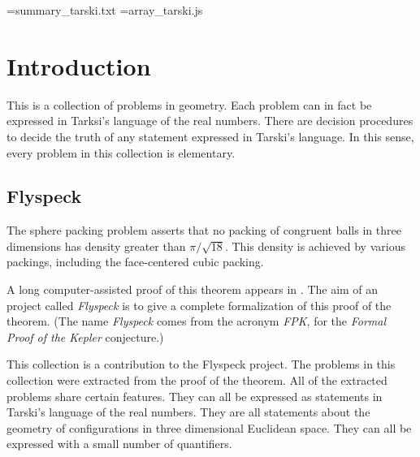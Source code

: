 






\newwrite\mywrite
\immediate\openout\mywrite=summary_tarski.txt
\newwrite\myhtml
\immediate\openout\myhtml=array_tarski.js

\def\filetarskiaway{
\immediate\write\mywrite{}\closeout\mywrite 
\immediate\write\myhtml{//fin}\closeout\myhtml
}


\section{Introduction}
\label{tarski:XX}


This is a collection of problems
in geometry.  Each problem can in fact be expressed in 
Tarksi's language of the real numbers.  There are decision
procedures to decide 
the truth of
any statement expressed in Tarski's language.  In this
sense, every problem in this collection is elementary.



\subsection{Flyspeck}

The sphere packing problem asserts that no packing of congruent
balls in three dimensions has density greater than $\pi/\sqrt{18}$.
This density is achieved by various packings, including the
face-centered cubic packing.

A long computer-assisted proof of this theorem appears
in \cite{DCG}.  The aim of an project called {\it Flyspeck} is
to give a complete formalization of this proof of the theorem.
  (The name {\it Flyspeck} comes from the acronym {\it FPK},
for the {\it Formal Proof of the Kepler} conjecture.)

This collection is a contribution to the Flyspeck project.  The problems
in this collection were extracted from the proof of the theorem.   
All of the extracted problems share certain 
features.  They can all be expressed as statements in Tarski's
language of the real numbers.  They are all statements
about the geometry of configurations in three dimensional Euclidean
space.  They can all be expressed with a small number of quantifiers.

